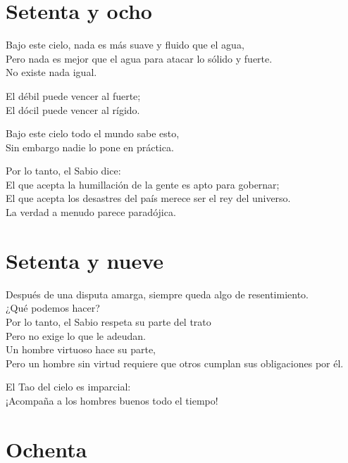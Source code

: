 \documentclass[hidelinks]{memoir}
\begin{document}
	\chapter*{Setenta y ocho}
	
	Bajo este cielo, nada es más suave y fluido que el agua,\\
	Pero nada es mejor que el agua para atacar lo sólido y fuerte.\\
	No existe nada igual.
	
	El débil puede vencer al fuerte;\\
	El dócil puede vencer al rígido.
	
	Bajo este cielo todo el mundo sabe esto,\\
	Sin embargo nadie lo pone en práctica.
	
	Por lo tanto, el Sabio dice:\\
	El que acepta la humillación de la gente es apto para gobernar;\\
	El que acepta los desastres del país merece ser el rey del universo.\\
	La verdad a menudo parece paradójica.
	
	\chapter*{Setenta y nueve}
	
	Después de una disputa amarga, siempre queda algo de resentimiento.\\
	¿Qué podemos hacer?\\
	Por lo tanto, el Sabio respeta su parte del trato\\
	Pero no exige lo que le adeudan.\\
	Un hombre virtuoso hace su parte,\\
	Pero un hombre sin virtud requiere que otros cumplan sus obligaciones
	por él.
	
	El Tao del cielo es imparcial:\\
	¡Acompaña a los hombres buenos todo el tiempo!
	
	\chapter*{Ochenta}
	
\end{document}
